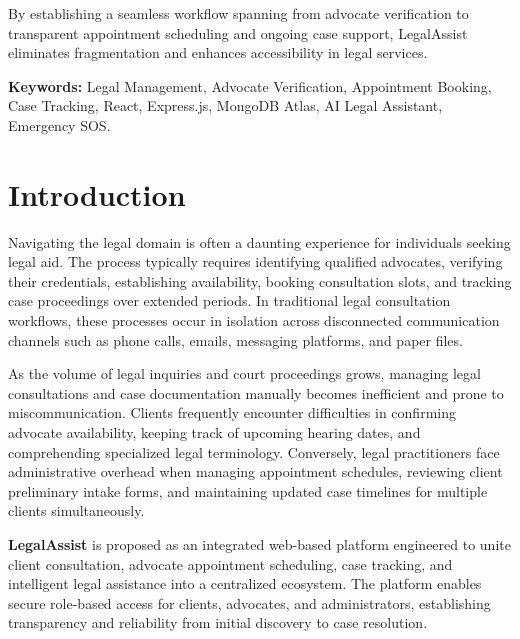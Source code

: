 \documentclass[12pt,a4paper]{report}
\begin{document}
By establishing a seamless workflow spanning from advocate verification to transparent appointment scheduling and ongoing case support, LegalAssist eliminates fragmentation and enhances accessibility in legal services.

\vspace{0.8cm}
\noindent \textbf{Keywords:} Legal Management, Advocate Verification, Appointment Booking, Case Tracking, React, Express.js, MongoDB Atlas, AI Legal Assistant, Emergency SOS.

\newpage

\tableofcontents
\newpage

\listoffigures
\newpage

\listoftables
\newpage

\setcounter{page}{1}

\chapter{Introduction}

Navigating the legal domain is often a daunting experience for individuals seeking legal aid. The process typically requires identifying qualified advocates, verifying their credentials, establishing availability, booking consultation slots, and tracking case proceedings over extended periods. In traditional legal consultation workflows, these processes occur in isolation across disconnected communication channels such as phone calls, emails, messaging platforms, and paper files.

As the volume of legal inquiries and court proceedings grows, managing legal consultations and case documentation manually becomes inefficient and prone to miscommunication. Clients frequently encounter difficulties in confirming advocate availability, keeping track of upcoming hearing dates, and comprehending specialized legal terminology. Conversely, legal practitioners face administrative overhead when managing appointment schedules, reviewing client preliminary intake forms, and maintaining updated case timelines for multiple clients simultaneously.

\textbf{LegalAssist} is proposed as an integrated web-based platform engineered to unite client consultation, advocate appointment scheduling, case tracking, and intelligent legal assistance into a centralized ecosystem. The platform enables secure role-based access for clients, advocates, and administrators, establishing transparency and reliability from initial discovery to case resolution.
\end{document}
